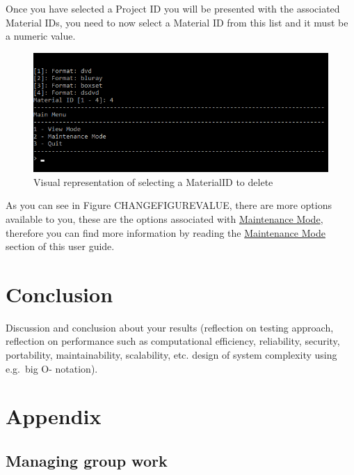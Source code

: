 \documentclass[
  english,
  a4paper,
,tablecaptionabove
]{scrartcl}
\begin{document}
Once you have selected a Project ID you will be presented with the
associated Material IDs, you need to now select a Material ID from this
list and it must be a numeric value.

\begin{figure}
\centering
\includegraphics{images/user-guide/maintenance-mode/remove-project-materials-select-id.png}
\caption{Visual representation of selecting a MaterialID to delete}
\end{figure}

As you can see in Figure CHANGEFIGUREVALUE, there are more options
available to you, these are the options associated with
\protect\hyperlink{using-maintenance-mode}{Maintenance Mode}, therefore
you can find more information by reading the
\protect\hyperlink{using-maintenance-mode}{Maintenance Mode} section of
this user guide.

\newpage

\hypertarget{conclusion}{%
\section{Conclusion}\label{conclusion}}

Discussion and conclusion about your results (reflection on testing
approach, reflection on performance such as computational efficiency,
reliability, security, portability, maintainability, scalability, etc.
design of system complexity using e.g.~big O- notation).

\newpage

\hypertarget{appendix}{%
\section{Appendix}\label{appendix}}

\hypertarget{managing-group-work}{%
\subsection{Managing group work}\label{managing-group-work}}
\end{document}
